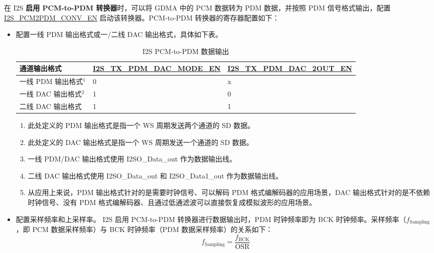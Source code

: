 \documentclass[main\_\_CN.tex]{subfiles}
\begin{document}
在 I2S \textbf{启用 PCM-to-PDM 转换器}时，可以将 GDMA 中的 PCM 数据转为 PDM 数据，并按照 PDM 信号格式输出，配置 \hyperref[fielddesc:I2SPCM2PDMCONVEN]{I2S\_PCM2PDM\_CONV\_EN} 启动该转换器。PCM-to-PDM 转换器的寄存器配置如下：

\begin{itemize}
    \item 配置一线 PDM 输出格式或一/二线 DAC 输出格式，具体如下表。
\begin{table}[H]
    \centering
    \caption{I2S PCM-to-PDM 数据输出}
    \label{tab:i2s-pcm-pdm-output-mode}
    \begin{tabular}{|p{4.3cm}|R{5.0cm}|R{4.8cm}|}
    \hline
    \textbf{通道输出格式}&\textbf{\hyperref[fielddesc:I2STXPDMDACMODEEN]{I2S\_TX\_PDM\_DAC\_MODE\_EN}} & \textbf{\hyperref[fielddesc:I2STXPDMDAC2OUTEN]{I2S\_TX\_PDM\_DAC\_2OUT\_EN}}\\ \hline
    一线 PDM 输出格式\hyperref[i2s-note-1]{$^1$}& 0 & x \\ \hline
    一线 DAC 输出格式\hyperref[i2s-note-2]{$^2$} &1   & 0  \\ \hline 
    二线 DAC 输出格式 & 1 & 1 \\ \hline
    \end{tabular}
\end{table}
\vspace{-1em}
\begin{tiplisting}
\vspace{-2em}
\begin{enumerate}
    \item \label{i2s-note-1} 此处定义的 PDM 输出格式是指一个 WS 周期发送两个通道的 SD 数据。
    \item \label{i2s-note-2} 此处定义的 DAC 输出格式是指一个 WS 周期发送一个通道的 SD 数据。
    \item 一线 PDM/DAC 输出格式使用 I2SO\_Data\_out 作为数据输出线。
    \item 二线 DAC 输出格式使用 I2SO\_Data\_out 和 I2SO\_Data1\_out 作为数据输出线。
    \item 从应用上来说，PDM 输出格式针对的是需要时钟信号、可以解码 PDM 格式编解码器的应用场景，DAC 输出格式针对的是不依赖时钟信号、没有 PDM 格式编解码器、且通过低通滤波可以直接恢复成模拟波形的应用场景。
\end{enumerate}
\end{tiplisting}
\vspace{-1em}

    \item 配置采样频率和上采样率。\newline
    I2S 启用 PCM-to-PDM 转换器进行数据输出时，PDM 时钟频率即为 BCK 时钟频率。采样频率（$f_{\textrm{Sampling}}$，即 PCM 数据采样频率）与 BCK 时钟频率（PDM 数据采样频率）的关系如下：
    $$f_{\textrm{Sampling}} = \frac{f_{\textrm{BCK}}}{\textrm{OSR}}$$
    

\end{itemize}
\end{document}
